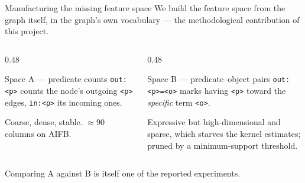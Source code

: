 \documentclass[10pt,aspectratio=169]{beamer}
\begin{document}
\begin{frame}{Manufacturing the missing feature space}
  We build the feature space \alert{from the graph itself}, in the graph's
  own vocabulary --- the methodological contribution of this project.

  \vfill
  \begin{columns}[T,onlytextwidth]
    \begin{column}{0.48\textwidth}
      \begin{block}{Space A --- predicate counts}
        \texttt{out:<p>} counts the node's outgoing \texttt{<p>} edges,
        \texttt{in:<p>} its incoming ones.
        \medskip

        Coarse, dense, stable. $\approx 90$ columns on AIFB.
      \end{block}
    \end{column}
    \begin{column}{0.48\textwidth}
      \begin{block}{Space B --- predicate--object pairs}
        \texttt{out:<p>=<o>} marks having \texttt{<p>} toward the
        \emph{specific} term \texttt{<o>}.
        \medskip

        Expressive but high-dimensional and sparse, which starves the kernel
        estimates; pruned by a minimum-support threshold.
      \end{block}
    \end{column}
  \end{columns}

  \vfill
  Comparing A against B is itself one of the reported experiments.
\end{frame}
\end{document}
